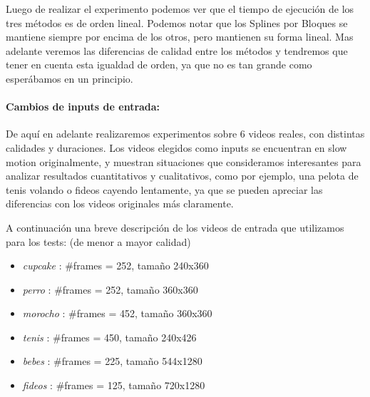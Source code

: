 \begin{figure}[ht]
	\begin{center}
	\end{center}
\end{figure}
\par Luego de realizar el experimento podemos ver que el tiempo de ejecuci\'on de los tres m\'etodos es de orden lineal. Podemos notar que los Splines por Bloques se mantiene siempre por encima de los otros, pero mantienen su forma lineal. Mas adelante veremos las diferencias de calidad entre los m\'etodos y tendremos que tener en cuenta esta igualdad de orden, ya que no es tan grande como esper\'abamos en un principio. 

\paragraph{Cambios de inputs de entrada:}
De aquí en adelante realizaremos experimentos sobre 6 videos reales, con distintas calidades y duraciones. Los videos elegidos como inputs se encuentran en slow motion originalmente, y muestran situaciones que consideramos interesantes para analizar resultados cuantitativos y cualitativos, como por ejemplo, una pelota de tenis volando o fideos cayendo lentamente, ya que se pueden apreciar las diferencias con los videos originales más claramente.
\par A continuación una breve descripción de los videos de entrada que utilizamos para los tests: (de menor a mayor calidad)
\begin{multicols}{2}
\begin{itemize}
\item \textit{cupcake} : $\#$frames = 252, tamaño 240x360
\item \textit{perro} : $\#$frames = 252, tamaño 360x360
\item \textit{morocho} : $\#$frames = 452, tamaño 360x360
\item \textit{tenis} : $\#$frames = 450, tamaño 240x426
\item \textit{bebes} : $\#$frames = 225, tamaño 544x1280
\item \textit{fideos} : $\#$frames = 125, tamaño 720x1280
\end{itemize}
\end{multicols}


